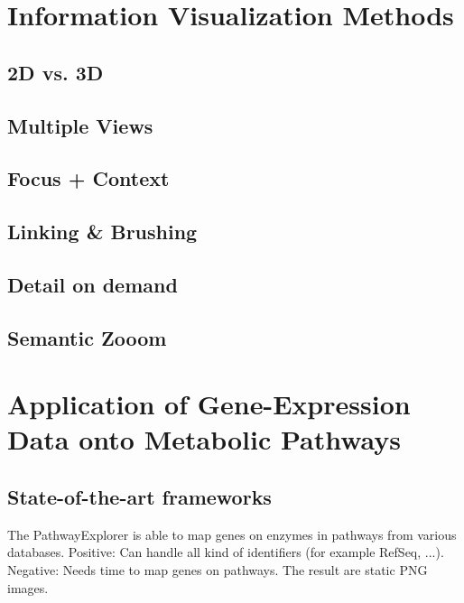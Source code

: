 
\section{Information Visualization Methods}

\citep{Bederson2003}
\citep{Spence2007}
\citep{Schumann2000}

\subsection{2D vs. 3D}

\subsection{Multiple Views}

\subsection{Focus + Context}

\subsection{Linking \& Brushing}

\subsection{Detail on demand}

\subsection{Semantic Zooom}

\section{Application of Gene-Expression Data onto Metabolic Pathways}

\subsection{State-of-the-art frameworks}


The PathwayExplorer is able to map genes on enzymes in pathways from various databases.
Positive: Can handle all kind of identifiers (for example RefSeq, ...).
Negative: Needs time to map genes on pathways. The result are static PNG images.

